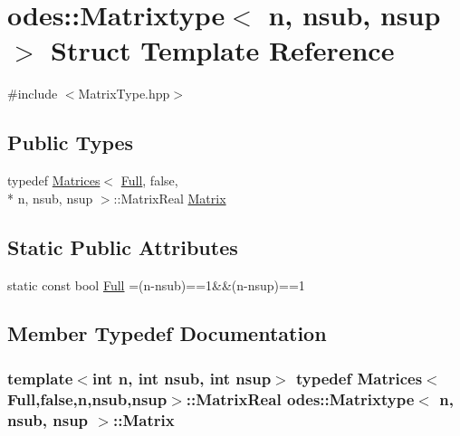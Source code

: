 \hypertarget{structodes_1_1Matrixtype}{\section{odes\-:\-:Matrixtype$<$ n, nsub, nsup $>$ Struct Template Reference}
\label{structodes_1_1Matrixtype}
}


{\ttfamily \#include $<$Matrix\-Type.\-hpp$>$}

\subsection*{Public Types}
\begin{DoxyCompactItemize}
\item 
typedef \hyperlink{classodes_1_1Matrices}{Matrices}$<$ \hyperlink{structodes_1_1Matrixtype_a37c01995f06fa3c28fe86cc6a3ce62a3}{Full}, false, \\*
n, nsub, nsup $>$\-::Matrix\-Real \hyperlink{structodes_1_1Matrixtype_afa0d0eadde25a06a3530a7781872c0bc}{Matrix}
\end{DoxyCompactItemize}
\subsection*{Static Public Attributes}
\begin{DoxyCompactItemize}
\item 
static const bool \hyperlink{structodes_1_1Matrixtype_a37c01995f06fa3c28fe86cc6a3ce62a3}{Full} =(n-\/nsub)==1\&\&(n-\/nsup)==1
\end{DoxyCompactItemize}


\subsection{Member Typedef Documentation}
\hypertarget{structodes_1_1Matrixtype_afa0d0eadde25a06a3530a7781872c0bc}{
\subsubsection[{Matrix}]{\setlength{\rightskip}{0pt plus 5cm}template$<$int n, int nsub, int nsup$>$ typedef {\bf Matrices}$<${\bf Full},false,n,nsub,nsup$>$\-::Matrix\-Real {\bf odes\-::\-Matrixtype}$<$ n, nsub, nsup $>$\-::{\bf Matrix}}}\label{structodes_1_1Matrixtype_afa0d0eadde25a06a3530a7781872c0bc}


